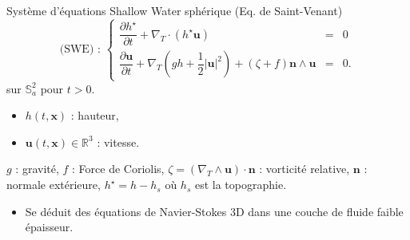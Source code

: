 \documentclass[11pt]{beamer}
\begin{document}
\begin{frame}{}
\begin{block}{Système d'équations Shallow Water sphérique (Eq. de Saint-Venant)}
\begin{equation*}
\text{(SWE) : }\left\lbrace
\begin{array}{rcl}
\dfrac{\partial h^{\star}}{\partial t} + \nabla_T \cdot \left( h^{\star} \mathbf{u} \right) & = & 0\\
\dfrac{\partial \mathbf{u}}{\partial t} + \nabla_T \left( gh + \dfrac{1}{2} |\mathbf{u}|^2 \right) + \left( \zeta + f \right) \mathbf{n} \wedge \mathbf{u} & = & 0.
\end{array}
\right.
\end{equation*}
sur $\mathbb{S}_a^2$ pour $t>0$.
\begin{itemize}
\item $h(t,\mathbf{x})$ : hauteur,
\item $\mathbf{u}(t,\mathbf{x}) \in \mathbb{R}^3$ : vitesse.
\end{itemize}

$g$ : gravité, $f$ : Force de Coriolis, $\zeta = (\nabla_T \wedge \mathbf{u}) \cdot \mathbf{n}$ : vorticité relative, $\mathbf{n}$ : normale extérieure, $h^{\star} = h - h_s$ où $h_s$ est la topographie.
\end{block}

\begin{itemize}
\item Se déduit des équations de Navier-Stokes 3D dans une couche de fluide faible épaisseur.
\end{itemize}
\end{frame}
\end{document}
